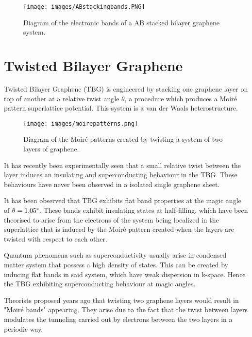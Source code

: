 \documentclass[a4paper,12pt]{report}
\begin{document}
\begin{figure}[h]
	\begin{center}
		\texttt{[image: images/ABstackingbands.PNG]}
	\end{center}
	\caption{Diagram of the electronic bands of a AB stacked bilayer graphene system. } 
	\label{fig:ABbilayergraphenebands}
\end{figure}

\section{Twisted Bilayer Graphene}

Twisted Bilayer Graphene (TBG) is engineered by stacking one graphene layer on top of another at a relative twist angle $\theta$, a procedure which produces a Moiré pattern superlattice potential. This system is a van der Waals heterostructure.

\begin{figure}[h]
	\begin{center}
		\texttt{[image: images/moirepatterns.png]}
	\end{center}
	\caption{Diagram of the Moiré patterns created by twisting a system of two layers of graphene. } 
	\label{fig:moiregraphene}
\end{figure}

It has recently been experimentally seen that a small relative twist between the layer induces an insulating and superconducting behaviour in the TBG. These behaviours have never been observed in a isolated single graphene sheet. 

It has been observed that TBG exhibits flat band properties at the magic angle of $\theta = 1.05 \degree$. These bands exhibit insulating states at half-filling, which have been theorised to arise from the electrons of the system being localized in the superlattice that is induced by the Moiré pattern created when the layers are twisted with respect to each other. 

Quantum phenomena such as superconductivity usually arise in condensed matter system that possess a high density of states. This can be created by inducing flat bands in said system, which have weak dispersion in k-space. Hence the TBG exhibiting superconducting behaviour at magic angles.

Theorists proposed years ago that twisting two graphene layers would result in "Moiré bands" appearing. They arise due to the fact that the twist between layers modulates the tunneling carried out by electrons between the two layers in a periodic way.
\end{document}
